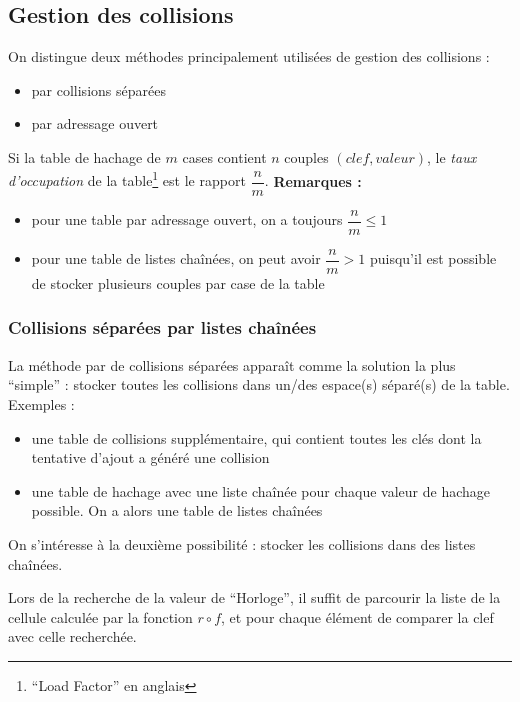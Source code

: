\documentclass[../../../main.tex]{subfiles}
\begin{document}
\subsection{Gestion des collisions}
On distingue deux méthodes principalement utilisées de gestion des collisions :
\begin{itemize}
	\item par collisions séparées
	\item par adressage ouvert
\end{itemize}
 {
Si la table de hachage de $m$ cases contient $n$ couples $(clef, valeur)$, le \textit{taux d'occupation} de la table\footnote{``Load Factor'' en anglais} est le rapport $\dfrac{n}{m}$.
}
\textbf{Remarques :}
\begin{itemize}
	\item pour une table par adressage ouvert, on a toujours $\dfrac{n}{m}\leq 1$
	\item pour une table de listes chaînées, on peut avoir $\dfrac{n}{m} > 1$ puisqu'il est possible de stocker plusieurs couples par case de la table
\end{itemize}
\subsubsection{Collisions séparées par listes chaînées}
La méthode par de collisions séparées apparaît comme la solution la plus ``simple'' : stocker toutes les collisions dans un/des espace(s) séparé(s) de la table. Exemples :
\begin{itemize}
	\item une table de collisions supplémentaire, qui contient toutes les clés dont la tentative d'ajout a généré une collision
	\item une table de hachage avec une liste chaînée pour chaque valeur de hachage possible. On a alors une table de listes chaînées
\end{itemize}
On s'intéresse à la deuxième possibilité : stocker les collisions dans des listes chaînées.

\begin{minipage}{\textwidth}
	\begin{center}
		
	\end{center}
\end{minipage}

Lors de la recherche de la valeur de ``Horloge'', il suffit de parcourir la liste de la cellule calculée par la fonction $r\circ f$, et pour chaque élément de comparer la clef avec celle recherchée.
\end{document}
